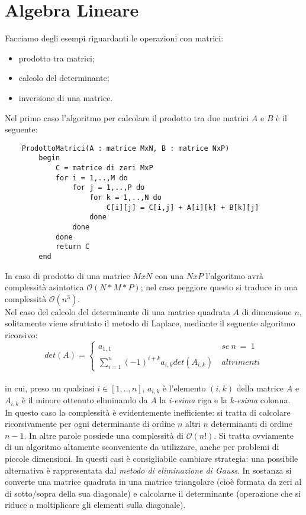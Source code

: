 \section{Algebra Lineare}
Facciamo degli esempi riguardanti le operazioni con matrici:
\begin{itemize}
\item{prodotto tra matrici;}
\item{calcolo del determinante;}
\item{inversione di una matrice.}
\end{itemize}
\newpage
\noindent Nel primo caso l'algoritmo per calcolare il prodotto tra due matrici $A$ e $B$ è il seguente:
\begin{verbatim}
    ProdottoMatrici(A : matrice MxN, B : matrice NxP)
        begin
            C = matrice di zeri MxP
            for i = 1,..,M do
                for j = 1,..,P do
                    for k = 1,..,N do
                        C[i][j] = C[i,j] + A[i][k] + B[k][j]
                    done
                done
            done
            return C
        end
\end{verbatim}
In caso di prodotto di una matrice $MxN$ con una $NxP$ l'algoritmo avrà complessità asintotica  $\mathcal {O}(N*M*P)$; nel caso peggiore questo si traduce in una complessità $\mathcal {O}(n^3)$.\\
Nel caso del calcolo del determinante di una matrice quadrata $A$ di dimensione $n$, solitamente viene sfruttato il metodo di Laplace, mediante il seguente algoritmo ricorsivo:
\[det(A) =\left\{
  \begin{array}{lr}
    a_{1,1} & \ se \ n  \ = \ 1 \\
    \sum\limits_{i=1}^n (-1)^{i+k} a_{i,k} det(A_{i,k}) & \ altrimenti
  \end{array}
\right.
\]\\
in cui, preso un qualsiasi $i \in [1,..,n]$, $a_{i,k}$ è l'elemento $(i,k)$ della matrice $A$ e $A_{i,k}$ è il minore ottenuto eliminando da $A$ la \textit{i-esima} riga e la \textit{k-esima} colonna.\\
In questo caso la complessità è evidentemente inefficiente: si tratta di calcolare ricorsivamente per ogni determinante di ordine $n$ altri $n$ determinanti di ordine $n-1$. In altre parole possiede una complessità di $\mathcal {O}(n!)$. Si tratta ovviamente di un algoritmo altamente sconveniente da utilizzare, anche per problemi di piccole dimensioni. In questi casi è consigliabile cambiare strategia: una possibile alternativa è rappresentata dal \textit{metodo di eliminazione di Gauss}. In sostanza si converte una matrice quadrata in una matrice triangolare (cioè formata da zeri al di sotto/sopra della sua diagonale) e calcolarne il determinante (operazione che si riduce a moltiplicare gli elementi sulla diagonale).

